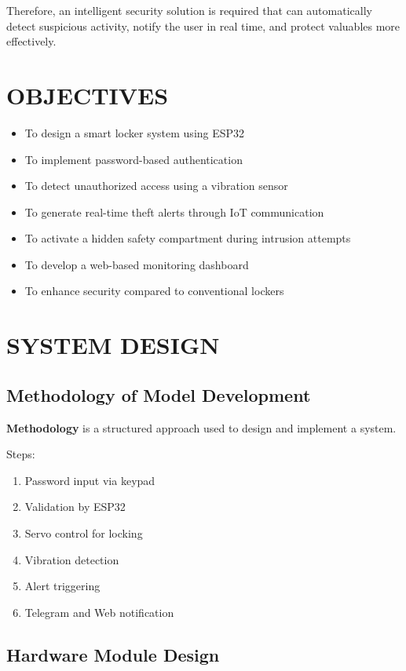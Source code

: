 \documentclass[conference]{IEEEtran}
\begin{document}
Therefore, an intelligent security solution is required that can automatically detect suspicious activity, notify the user in real time, and protect valuables more effectively.

\section{OBJECTIVES}

\begin{itemize}
    \item To design a smart locker system using ESP32
    \item To implement password-based authentication
    \item To detect unauthorized access using a vibration sensor
    \item To generate real-time theft alerts through IoT communication
    \item To activate a hidden safety compartment during intrusion attempts
    \item To develop a web-based monitoring dashboard
    \item To enhance security compared to conventional lockers
\end{itemize}

\section{SYSTEM DESIGN}

\subsection{Methodology of Model Development}

\textbf{Methodology} is a structured approach used to design and implement a system.

Steps:
\begin{enumerate}
\item Password input via keypad
\item Validation by ESP32
\item Servo control for locking
\item Vibration detection
\item Alert triggering
\item Telegram and Web notification
\end{enumerate}

\subsection{Hardware Module Design}
\end{document}
